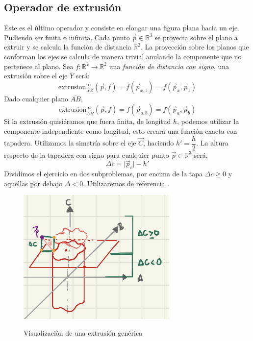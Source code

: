 \subsection{Operador de extrusión}
Este es el último operador y consiste en elongar una figura plana hacia un eje. Pudiendo ser finita o infinita. Cada punto \(\Vec{p}\in\mathbb{R}^3\) se proyecta sobre el plano a extruir y se calcula la función de distancia \(\mathbb{R}^2\). La proyección sobre los planos que conforman los ejes se calcula de manera trivial anulando la componente que no pertenece al plano. Sea \(f:\mathbb{R}^2\longrightarrow\mathbb{R}^2\) una \textit{función de distancia con signo}, una extrusión sobre el eje \(\overline{Y}\) será:
\[\text{extrusion}^\infty_{\overline{XZ}}\left(\Vec{p},f\right) = f\left(\Vec{p}_{x,z}\right)=f\left(\Vec{p}_{x}, \Vec{p}_{z}\right)\]
Dado cualquier plano \(\overline{AB}\),
\[\text{extrusion}^\infty_{\overline{AB}}\left(\Vec{p},f\right) = f\left(\Vec{p}_{a,b}\right)=f\left(\Vec{p}_{a}, \Vec{p}_{b}\right)\]
Si la extrusión quisiéramos que fuera finita, de longitud \(h\), podemos utilizar la componente independiente como longitud, esto creará una función exacta con tapadera. Utilizamos la simetría sobre el eje \(\Vec{C}\), haciendo \(h'=\dfrac{h}{2}\). La altura respecto de la tapadera con signo para cualquier punto \(\Vec{p} \in\mathbb{R}^3\) será,
\[\Delta c  =\vert\Vec{p}_c\vert - h'\]
Dividimos el ejercicio en dos subproblemas, por encima de la tapa \(\Delta c \ge 0\) y aquellas por debajo \(\Delta < 0\). Utilizaremos de referencia .

\begin{figure}[H]
  \centering
  \captionsetup{justification=centering}%
  \includegraphics[width=0.7\textwidth]{secciones/imagenes/proof_2.jpeg}\label{fig:capsula}
  \caption{Visualización de una extrusión genérica}
\end{figure}

